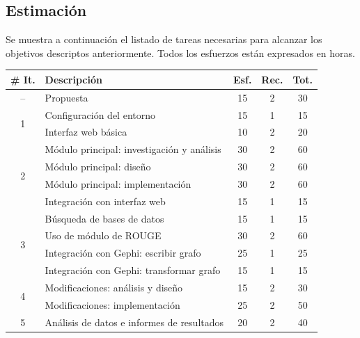 \documentclass[12pt,a4paper]{article}
\begin{document}
\subsection{Estimación}
Se muestra a continuación el listado de tareas necesarias para alcanzar los
objetivos descriptos anteriormente. Todos los esfuerzos están expresados en 
horas.

\begin{center}
    \begin{tabular}{ | c | l | c | c | c | }
    \hline
        \textbf{\# It.}     & \textbf{Descripción} & \textbf{Esf.} & \textbf{Rec.} & \textbf{Tot.}  \\ \hline
        --                  & Propuesta                                     & 15    & 2     & 30    \\ \hline
        \multirow{2}{*}{1}  & Configuración del entorno                     & 15    & 1     & 15    \\
                            & Interfaz web básica                           & 10    & 2     & 20    \\ \hline
        \multirow{4}{*}{2}  & Módulo principal: investigación y análisis    & 30    & 2     & 60    \\
                            & Módulo principal: diseño                      & 30    & 2     & 60    \\
                            & Módulo principal: implementación              & 30    & 2     & 60    \\
                            & Integración con interfaz web                  & 15    & 1     & 15    \\ \hline
        \multirow{4}{*}{3}  & Búsqueda de bases de datos                    & 15    & 1     & 15    \\
                            & Uso de módulo de ROUGE                        & 30    & 2     & 60    \\
                            & Integración con Gephi: escribir grafo         & 25    & 1     & 25    \\
                            & Integración con Gephi: transformar grafo      & 15    & 1     & 15    \\ \hline
        \multirow{2}{*}{4}  & Modificaciones: análisis y diseño             & 15    & 2     & 30    \\
                            & Modificaciones: implementación                & 25    & 2     & 50    \\ \hline
        \multirow{2}{*}{5}  & Análisis de datos e informes de resultados    & 20    & 2     & 40    \\ 

\end{tabular}
\end{center}
\end{document}
